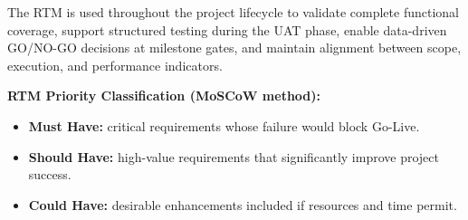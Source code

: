 The RTM is used throughout the project lifecycle to validate complete functional coverage,
support structured testing during the UAT phase, enable data-driven GO/NO-GO decisions at
milestone gates, and maintain alignment between scope, execution, and performance indicators.

\medskip
\noindent\textbf{RTM Priority Classification (MoSCoW method):}
\begin{itemize}
    \item \textbf{\textcolor{musthave}{Must Have:}} critical requirements whose failure would block Go-Live.
    \item \textbf{\textcolor{shouldhave}{Should Have:}} high-value requirements that significantly improve project success.
    \item \textbf{\textcolor{couldhave}{Could Have:}} desirable enhancements included if resources and time permit.
\end{itemize}

